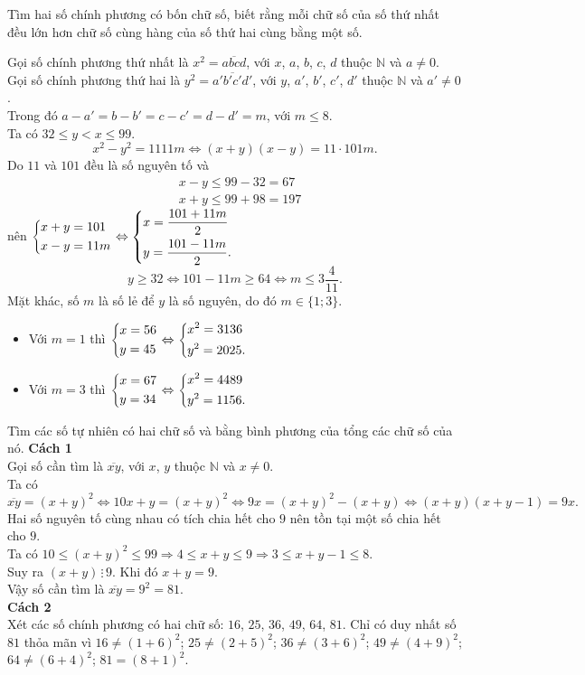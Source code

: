 \begin{bt}
 Tìm hai số chính phương có bốn chữ số, biết rằng mỗi chữ số của số thứ nhất đều lớn hơn chữ số cùng hàng của số thứ hai cùng bằng một số.
 \loigiai
  {
  Gọi số chính phương thứ nhất là $x^2 = \overline{abcd}$, với $x$, $a$, $b$, $c$, $d$ thuộc $\mathbb{N}$ và $a \neq 0$.\\
  Gọi số chính phương thứ hai là $y^2 = \overline{a'b'c'd'}$, với $y$, $a'$, $b'$, $c'$, $d'$ thuộc $\mathbb{N}$ và $a' \neq 0$.\\
  Trong đó $a - a' = b - b' = c - c' = d - d' = m$, với $m \leq 8$.\\
  Ta có $32 \leq y < x \leq 99$.
  $$x^2 - y^2 = 1111m \Leftrightarrow (x + y)(x - y) = 11 \cdot 101m.$$
  Do $11$ và $101$ đều là số nguyên tố và
  \begin{align*}
   & x - y \leq 99 - 32 = 67 \\
   & x + y \leq 99 + 98 = 197
  \end{align*}
  nên $\left\{\begin{aligned}& x + y = 101 \\& x - y = 11m\end{aligned}\right. \Leftrightarrow \left\{\begin{aligned}& x = \dfrac{101 + 11m}{2} \\& y = \dfrac{101 - 11m}{2}.\end{aligned}\right.$
  $$y \geq 32 \Leftrightarrow 101 - 11m \geq 64 \Leftrightarrow m \leq 3\dfrac{4}{11}.$$
  Mặt khác, số $m$ là số lẻ để $y$ là số nguyên, do đó $m \in \{ 1; 3 \}$.
  \begin{itemize}
   \item Với $m = 1$ thì $\left\{\begin{aligned}& x = 56 \\& y = 45\end{aligned}\right. \Leftrightarrow \left\{\begin{aligned}& x^2 = 3136 \\& y^2 = 2025.\end{aligned}\right.$
   \item Với $m = 3$ thì $\left\{\begin{aligned}& x = 67 \\& y = 34\end{aligned}\right. \Leftrightarrow \left\{\begin{aligned}& x^2 = 4489 \\& y^2 = 1156.\end{aligned}\right.$
  \end{itemize}
  }
\end{bt}


\begin{bt}
 Tìm các số tự nhiên có hai chữ số và bằng bình phương của tổng các chữ số của nó.
 \loigiai
  {
  \textbf{Cách 1} \\
  Gọi số cần tìm là $\overline{xy}$, với $x$, $y$ thuộc $\mathbb{N}$ và $x \neq 0$.\\
  Ta có
  $$ \overline{xy} = (x + y )^2 \Leftrightarrow 10x + y = (x + y)^2 \Leftrightarrow 9x = (x + y)^2 - (x + y) \Leftrightarrow (x + y)(x + y - 1) = 9x.$$
  Hai số nguyên tố cùng nhau có tích chia hết cho $9$ nên tồn tại một số chia hết cho $9$.\\
  Ta có $10 \leq (x + y)^2 \leq 99 \Rightarrow 4 \leq x + y \leq 9 \Rightarrow 3 \leq x + y - 1 \leq 8$.\\
  Suy ra $(x + y) \, \vdots \, 9$. Khi đó $x + y = 9$.\\
  Vậy số cần tìm là $\overline{xy} = 9^2 = 81$.\\
  \textbf{Cách 2}\\
  Xét các số chính phương có hai chữ số: $16$, $25$, $36$, $49$, $64$, $81$. Chỉ có duy nhất số $81$ thỏa mãn vì $16 \neq (1 + 6)^2$; $25 \neq (2 + 5)^2$; $36 \neq (3 + 6)^2$; $49 \neq (4 + 9)^2$; $64 \neq (6 + 4)^2$; $81 = (8 + 1)^2$.
  }
\end{bt}


